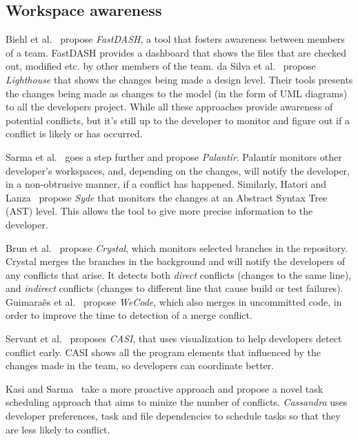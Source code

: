 \subsection{Workspace awareness} 

Biehl et al.~\cite{biehl_fastdash:_2007} propose \emph{FastDASH}, a tool that fosters awareness between members of a team. 
FastDASH provides a dashboard that shows the files that are checked out, modified etc. by other members of the team.
da Silva et al.~\cite{da_silva_lighthouse:_2006} propose \emph{Lighthouse} that shows the changes being made a design level.
Their tools presents the changes being made as changes to the model (in the form of UML diagrams) to all the developers project.
While all these approaches provide awareness of potential conflicts, but it's still up to the developer to monitor and figure out if a conflict is likely or has occurred.

Sarma et al.~\cite{palantir, sarma_palantir:_2003} goes a step further and propose \emph{Palant\'{i}r}.
Palant\'{i}r monitors other developer's workspaces, and, depending on the changes, will notify the developer, in a non-obtrusive manner, if a conflict has happened.
Similarly, Hatori and Lanza~\cite{hattori2010syde} propose \emph{Syde} that monitors the changes at an Abstract Syntax Tree (AST) level.
This allows the tool to give more precise information to the developer.

Brun et al.~\cite{Brun2011} propose \emph{Crystal}, which monitors selected branches in the repository. 
Crystal merges the branches in the background and will notify the developers of any conflicts that arise. 
It detects both \emph{direct} conflicts (changes to the same line), and \emph{indirect} conflicts (changes to different line that cause build or test failures).
Guimara\~{e}s et al.~\cite{Guimaraes} propose \emph{WeCode}, which also merges in uncommitted code, in order to improve the time to detection of a merge conflict.

Servant et al.~\cite{servant_casi:_2010} proposes \emph{CASI}, that uses visualization to help developers detect conflict early.
CASI shows all the program elements that influenced by the changes made in the team, so developers can coordinate better.

Kasi and Sarma~\cite{kasi_cassandra:_2013} take a more proactive approach and propose a novel task scheduling approach that aims to minize the number of conflicts. 
\emph{Cassandra} uses developer preferences, task and file dependencies to schedule tasks so that they are less likely to conflict.
